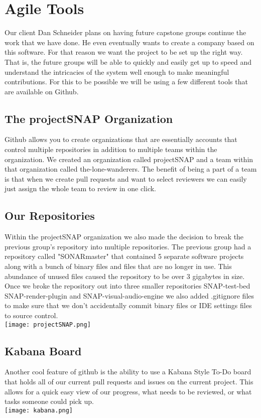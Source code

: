 \documentclass{scrreprt}
\begin{document}
\section{Agile Tools}
Our client Dan Schneider plans on having future capstone groups continue the work that we have done. He even eventually wants to create a company based on this software. For that reason we want the project to be set up the right way. That is, the future groups will be able to quickly and easily get up to speed and understand the intricacies of the system well enough to make meaningful contributions. For this to be possible we will be using a few different tools that are available on Github.
\subsection{The projectSNAP Organization}
Github allows you to create organizations that are essentially accounts that control multiple repositories in addition to multiple teams within the organization. We created an organization called projectSNAP and a team within that organization called the-lone-wanderers. The benefit of being a part of a team is that when we create pull requests and want to select reviewers we can easily just assign the whole team to review in one click.\\
\pagebreak
\subsection{Our Repositories}
Within the projectSNAP organization we also made the decision to break the previous group's repository into multiple repositories. The previous group had a repository called "SONARmaster" that contained 5 separate software projects along with a bunch of binary files and files that are no longer in use. This abundance of unused files caused the repository to be over 3 gigabytes in size. Once we broke the repository out into three smaller repositories SNAP-test-bed SNAP-render-plugin and SNAP-visual-audio-engine we also added .gitignore files to make sure that we don't accidentally commit binary files or IDE settings files to source control.\\

\texttt{[image: projectSNAP.png]}\\
\pagebreak
\subsection{Kabana Board}
Another cool feature of github is the ability to use a Kabana Style To-Do board that holds all of our current pull requests and issues on the current project. This allows for a quick easy view of our progress, what needs to be reviewed, or what tasks someone could pick up.\\
\texttt{[image: kabana.png]}\\
\end{document}
